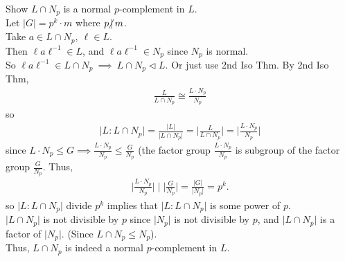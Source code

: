 \documentclass{article}
\begin{document}
\begin{homeworkProblem}
    Show $L \cap N_p$ is a normal $p$-complement in $L$.\\
    Let $\lvert G \rvert = p^k \cdot m$ where $p \hspace{-4pt}\not| \hspace{2pt} m$.\\
    Take $a \in L \cap N_p, \ \ell \in L$. \\
    Then $\ell a \ell^{-1} \in L$, and $\ell a \ell^{-1} \in N_p$ since $N_p$ is normal.\\
    So $\ell a \ell^{-1} \in L \cap N_p \ \implies \ L \cap N_p \lhd L$.
    Or just use 2nd Iso Thm. By 2nd Iso Thm,
    \begin{align}
        \frac{ L }{ L \cap N_p } \cong \frac{ L \cdot N_p }{ N_p }
    \end{align}
    so 
    \begin{align}
        \lvert L: L \cap N_p \rvert = \frac{ \lvert L \rvert }{ \lvert L \cap N_p \rvert } 
        = \lvert \frac{ L }{ L \cap N_p }\rvert = \lvert \frac{ L \cdot N_p }{ N_p }\rvert
    \end{align}
    since $L \cdot N_p \leq G \implies \frac{ L \cdot N_p }{ N_p } \leq \frac{ G }{ N_p }$ 
    (the factor group $\frac{ L \cdot N_p }{ N_p }$ is subgroup 
    of the factor group $\frac{ G }{ N_p }$. Thus,
    \begin{align}
        \lvert \frac{ L \cdot N_p }{ N_p }\rvert \mid \lvert \frac{ G }{ N_p }\rvert = \frac{ \lvert G \rvert }{ \lvert N_p \rvert } = p^k.
    \end{align}
    so $\lvert L:L \cap N_p \rvert$ divide $p^k$ implies that $\lvert L: L \cap N_p \rvert$
    is some power of $p$.\\
    $\lvert L \cap N_p \rvert$ is not divisible by $p$ since $\lvert N_p \rvert$ is not divisible
    by $p$, and $\lvert L \cap N_p \rvert$ is a factor of $\lvert N_p \rvert$.
    (Since $L \cap N_p \leq N_p$).\\
    Thus, $L \cap N_p$ is indeed a normal $p$-complement in $L$.\\


\end{homeworkProblem}
\end{document}
